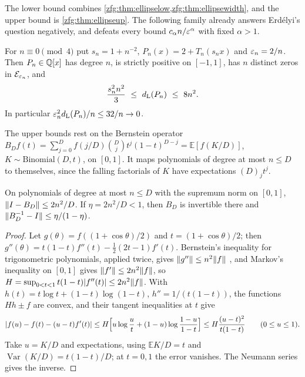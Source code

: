 The lower bound combines \cref{zfg:thm:ellipselow,zfg:thm:ellipsewidth}, and the upper bound is \cref{zfg:thm:ellipseup}.
The following family already answers Erd\'elyi's question negatively, and defeats every bound $c_\alpha n/\varepsilon^\alpha$ with fixed
$\alpha>1$.

\begin{theorem}\label{zfg:thm:erdelyi}
For $n\equiv0\pmod4$ put $s_n=1+n^{-2}$, $P_n(x)=2+T_n(s_nx)$ and $\varepsilon_n=2/n$. Then $P_n\in\mathbb{Q}[x]$ has degree $n$, is strictly positive
on $[-1,1]$, has $n$ distinct zeros in $\mathcal E_{\varepsilon_n}$, and
\[
 \frac{s_n^2n^2}3\ \le\ \zfgdL(P_n)\ \le\ 8n^2 .
\]
In particular $\varepsilon_n^2d_{\mathrm L}(P_n)/n\le32/n\to0$.
\end{theorem}

The upper bounds rest on the Bernstein operator $B_Df(t)=\sum_{j=0}^Df(j/D)\binom Djt^j(1-t)^{D-j}=\mathbb E[f(K/D)]$, $K\sim\mathrm{Binomial}(D,t)$,
on $[0,1]$. It maps polynomials of degree at most $n\le D$ to themselves, since the falling factorials of $K$ have
expectations $(D)_jt^j$.

\begin{lemma}\label{zfg:lem:bernstein}
On polynomials of degree at most $n\le D$ with the supremum norm on $[0,1]$, $\lVert I-B_D\rVert\le2n^2/D$. If $\eta=2n^2/D<1$, then $B_D$
is invertible there and $\lVert B_D^{-1}-I\rVert\le\eta/(1-\eta)$.
\end{lemma}

\begin{proof}
Let $g(\theta)=f((1+\cos\theta)/2)$ and $t=(1+\cos\theta)/2$; then $g''(\theta)=t(1-t)f''(t)-\tfrac12(2t-1)f'(t)$. Bernstein's inequality for
trigonometric polynomials, applied twice, gives $\lVert g''\rVert\le n^2\lVert f\rVert$ \cite{QueffelecZarouf2019Bernstein}, and Markov's
inequality on $[0,1]$ gives $\lVert f'\rVert\le2n^2\lVert f\rVert$, so $H=\sup_{0<t<1}t(1-t)\lvert f''(t)\rvert\le2n^2\lVert f\rVert$. With
$h(t)=t\log t+(1-t)\log(1-t)$, $h''=1/(t(1-t))$, the functions $Hh\pm f$ are convex, and their tangent inequalities at $t$ give
\[
 \lvert f(u)-f(t)-(u-t)f'(t)\rvert\le H\Bigl[u\log\frac ut+(1-u)\log\frac{1-u}{1-t}\Bigr]\le H\frac{(u-t)^2}{t(1-t)}\qquad(0\le u\le1).
\]
Take $u=K/D$ and expectations, using $\mathbb EK/D=t$ and $\operatorname{Var}(K/D)=t(1-t)/D$; at $t=0,1$ the error vanishes. The
Neumann series gives the inverse.
\end{proof}

